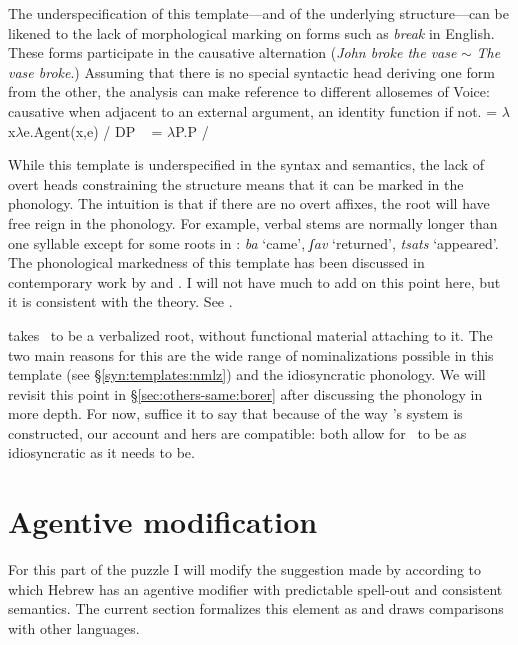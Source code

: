 The underspecification of this template---and of the underlying structure---can be likened to the lack of morphological marking on forms such as \emph{break} in English. These forms participate in the causative alternation (\emph{John broke the vase} $\sim$ \emph{The vase broke}.) Assuming that there is no special syntactic head deriving one form from the other, the analysis can make reference to different allosemes of Voice: causative when adjacent to an external argument, an identity function if not.
\pex
	\a {} = $\lambda$x$\lambda$e.Agent(x,e) / DP \trace~
	\a {} = $\lambda$P.P / \trace~
\xe

While this template is underspecified in the syntax and semantics, the lack of overt heads constraining the structure means that it can be marked in the phonology. {The intuition is that if there are no overt affixes, the root will have free reign in the phonology.} For example, verbal stems are normally longer than one syllable except for some roots in \tkal:
\ex \emph{ba} `came', \emph{ʃav} `returned', \emph{tsats} `appeared'.
\xe
The phonological markedness of this template has been discussed in contemporary work by \cite{ussishkin00phd,ussishkin05} and \cite{laks11}. I will not have much to add on this point here, but it is consistent with the theory. See \cite{kastner18nllt}.

\cite{borer13oup,borer15roots} takes \tkal~to be a verbalized root, without functional material attaching to it. The two main reasons for this are the wide range of nominalizations possible in this template (see \S\ref{syn:templates:nmlz}) and the idiosyncratic phonology. We will revisit this point in {\S\ref{sec:others-same:borer}} after discussing the phonology in more depth. For now, suffice it to say that because of the way \citeauthor{borer13oup}'s system is constructed, our account and hers are compatible: both allow for \tkal~to be as idiosyncratic as it needs to be.


\section{Agentive modification} \label{voice:va}

For this part of the puzzle I will modify the suggestion made by \cite{doron03} according to which Hebrew has an agentive modifier with predictable spell-out and consistent semantics. The current section formalizes this element as {\va} and draws comparisons with other languages.

